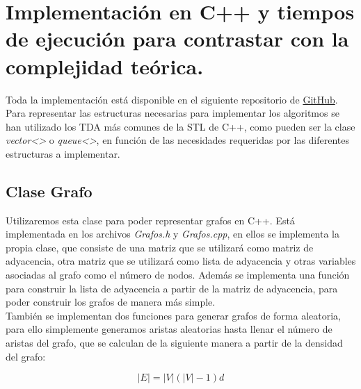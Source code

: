 
\chapter{Implementación en C++ y tiempos de ejecución para contrastar con la complejidad teórica.}\label{ch:quinto-capitulo}

Toda la implementación está disponible en el siguiente repositorio de \href{https://github.com/PabloC01/TFG}{GitHub}. \\

Para representar las estructuras necesarias para implementar los algoritmos se han utilizado los TDA más comunes de la STL de C++, como pueden ser la clase \textit{vector<>} o \textit{queue<>}, en función de las necesidades requeridas por las diferentes estructuras a implementar.

\section{Clase Grafo}

Utilizaremos esta clase para poder representar grafos en C++. Está implementada en los archivos \textit{Grafos.h} y \textit{Grafos.cpp}, en ellos se implementa la propia clase, que consiste de una matriz que se utilizará como matriz de adyacencia, otra matriz que se utilizará como lista de adyacencia y otras variables asociadas al grafo como el número de nodos. Además se implementa una función para construir la lista de adyacencia a partir de la matriz de adyacencia, para poder construir los grafos de manera más simple. \\

También se implementan dos funciones para generar grafos de forma aleatoria, para ello simplemente generamos aristas aleatorias hasta llenar el número de aristas del grafo, que se calculan de la siguiente manera a partir de la densidad del grafo:

$$|E| = |V|(|V| - 1)d$$


